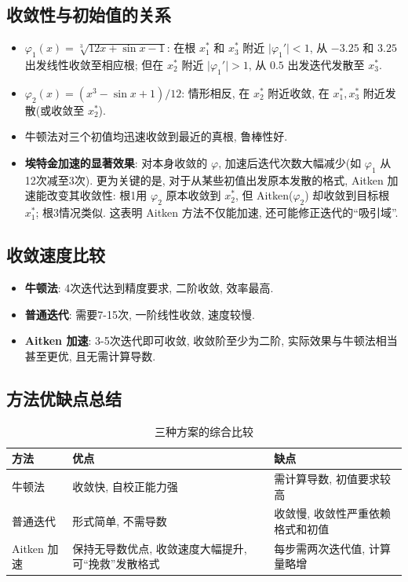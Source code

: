 \documentclass[12pt,a4paper]{ctexart}
\begin{document}
\subsection*{收敛性与初始值的关系}
\begin{itemize}
    \item $\varphi_1(x)=\sqrt[3]{12x+\sin x-1}$: 在根 $x_1^*$ 和 $x_3^*$ 附近 $\lvert\varphi_1'\rvert<1$, 从 $-3.25$ 和 $3.25$ 出发线性收敛至相应根; 但在 $x_2^*$ 附近 $\lvert\varphi_1'\rvert>1$, 从 $0.5$ 出发迭代发散至 $x_3^*$. 
    \item $\varphi_2(x)=(x^3-\sin x+1)/12$: 情形相反, 在 $x_2^*$ 附近收敛, 在 $x_1^*,x_3^*$ 附近发散(或收敛至 $x_2^*$). 
    \item 牛顿法对三个初值均迅速收敛到最近的真根, 鲁棒性好. 
    \item \textbf{埃特金加速的显著效果}: 对本身收敛的 $\varphi$, 加速后迭代次数大幅减少(如 $\varphi_1$ 从12次减至3次). 更为关键的是, 对于从某些初值出发原本发散的格式, Aitken 加速能改变其收敛性: 根1用 $\varphi_2$ 原本收敛到 $x_2^*$, 但 Aitken($\varphi_2$) 却收敛到目标根 $x_1^*$; 根3情况类似. 这表明 Aitken 方法不仅能加速, 还可能修正迭代的“吸引域”. 
\end{itemize}

\subsection*{收敛速度比较}
\begin{itemize}
    \item \textbf{牛顿法}: 4次迭代达到精度要求, 二阶收敛, 效率最高. 
    \item \textbf{普通迭代}: 需要7-15次, 一阶线性收敛, 速度较慢. 
    \item \textbf{Aitken 加速}: 3-5次迭代即可收敛, 收敛阶至少为二阶, 实际效果与牛顿法相当甚至更优, 且无需计算导数. 
\end{itemize}

\subsection*{方法优缺点总结}
\begin{table}[htbp]
    \centering
    \caption{三种方案的综合比较}
    \begin{tabular}{@{}p{2.5cm}p{5cm}p{5cm}@{}}
        \toprule
        方法 & 优点 & 缺点 \\
        \midrule
        牛顿法 & 收敛快, 自校正能力强 & 需计算导数, 初值要求较高 \\
        普通迭代 & 形式简单, 不需导数 & 收敛慢, 收敛性严重依赖格式和初值 \\
        Aitken 加速 & 保持无导数优点, 收敛速度大幅提升, 可“挽救”发散格式 & 每步需两次迭代值, 计算量略增 \\
        \bottomrule
    \end{tabular}
\end{table}
\end{document}
